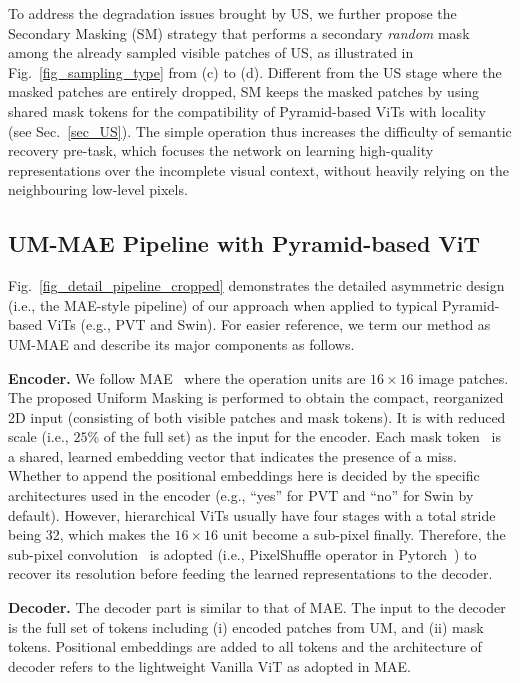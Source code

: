 \documentclass{article}
\begin{document}
To address the degradation issues brought by US, we further propose the Secondary Masking (SM) strategy that performs a secondary \emph{random} mask among the already sampled visible patches of US, as illustrated in Fig.~\ref{fig_sampling_type} from (c) to (d). Different from the US stage where the masked patches are entirely dropped, SM keeps the masked patches by using shared mask tokens for the compatibility of Pyramid-based ViTs with locality (see Sec.~\ref{sec_US}).
The simple operation thus increases the difficulty of semantic recovery pre-task, which focuses the network on learning high-quality representations over the incomplete visual context, without heavily relying on the neighbouring low-level pixels.








\subsection{UM-MAE Pipeline with Pyramid-based ViT}
Fig.~\ref{fig_detail_pipeline_cropped} demonstrates the detailed asymmetric design (i.e., the MAE-style pipeline) of our approach when applied to typical Pyramid-based ViTs (e.g., PVT and Swin). For easier reference, we term our method as UM-MAE and describe its major components as follows.

\textbf{Encoder.} We follow MAE~\cite{he2021masked} where the operation units are $16\times 16$ image patches. The proposed Uniform Masking is performed to obtain the compact, reorganized 2D input (consisting of both visible patches and mask tokens). It is with reduced scale (i.e., $25\%$ of the full set) as the input for the encoder. Each mask token~\cite{devlin2018bert} is a shared, learned embedding vector that indicates the presence of a miss. Whether to append the positional embeddings here is decided by the specific architectures used in the encoder (e.g., ``yes'' for PVT and ``no'' for Swin by default). 
However, hierarchical ViTs usually have four stages with a total stride being 32, which makes the $16\times 16$ unit become a sub-pixel finally. Therefore, the sub-pixel convolution~\cite{shi2016real} is adopted (i.e., PixelShuffle operator in Pytorch~\cite{paszke2019pytorch}) to recover its resolution before feeding the learned representations to the decoder.

\textbf{Decoder.} The decoder part is similar to that of MAE. The input to the decoder is the full set of tokens including (i) encoded patches from UM, and (ii) mask tokens. Positional embeddings are added to all tokens and the architecture of decoder refers to the lightweight Vanilla ViT as adopted in MAE.
\end{document}
